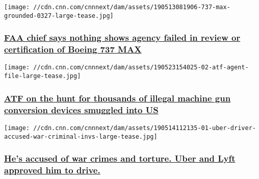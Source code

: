 \href{/2019/05/23/politics/faa-boeing-max-crashes-elwell/index.html}{}

\texttt{[image: //cdn.cnn.com/cnnnext/dam/assets/190513081906-737-max-grounded-0327-large-tease.jpg]}

\hypertarget{faa-chief-says-nothing-shows-agency-failed-in-review-or-certification-of-boeing-737-max}{%
\subsubsection{\texorpdfstring{\href{/2019/05/23/politics/faa-boeing-max-crashes-elwell/index.html}{FAA
chief says nothing shows agency failed in review or certification of
Boeing 737
MAX}}{FAA chief says nothing shows agency failed in review or certification of Boeing 737 MAX}}\label{faa-chief-says-nothing-shows-agency-failed-in-review-or-certification-of-boeing-737-max}}

\href{/2019/05/23/us/atf-agents-hunting-down-illegal-machine-gun-device-invs/index.html}{}

\texttt{[image: //cdn.cnn.com/cnnnext/dam/assets/190523154025-02-atf-agent-file-large-tease.jpg]}

\hypertarget{atf-on-the-hunt-for-thousands-of-illegal-machine-gun-conversion-devices-smuggled-into-us}{%
\subsubsection{\texorpdfstring{\href{/2019/05/23/us/atf-agents-hunting-down-illegal-machine-gun-device-invs/index.html}{ATF
on the hunt for thousands of illegal machine gun conversion devices
smuggled into
US}}{ATF on the hunt for thousands of illegal machine gun conversion devices smuggled into US}}\label{atf-on-the-hunt-for-thousands-of-illegal-machine-gun-conversion-devices-smuggled-into-us}}

\href{/2019/05/14/business/uber-driver-accused-war-criminal-invs/index.html}{}

\texttt{[image: //cdn.cnn.com/cnnnext/dam/assets/190514112135-01-uber-driver-accused-war-criminal-invs-large-tease.jpg]}

\hypertarget{hes-accused-of-war-crimes-and-torture-uber-and-lyft-approved-him-to-drive}{%
\subsubsection{\texorpdfstring{\href{/2019/05/14/business/uber-driver-accused-war-criminal-invs/index.html}{He's
accused of war crimes and torture. Uber and Lyft approved him to
drive.}}{He's accused of war crimes and torture. Uber and Lyft approved him to drive.}}\label{hes-accused-of-war-crimes-and-torture-uber-and-lyft-approved-him-to-drive}}

